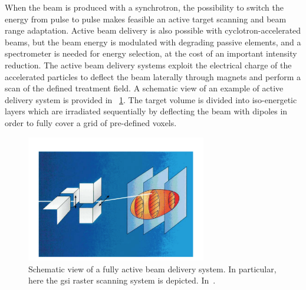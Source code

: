 When the beam is produced with a synchrotron,  the possibility to switch the energy from pulse to pulse makes feasible an active target scanning and beam range adaptation. Active beam delivery is also possible with cyclotron-accelerated beams, but the beam energy is modulated with degrading passive elements, and a spectrometer is needed for energy selection, at the cost of an important intensity reduction. The active beam delivery systems exploit the electrical charge of the accelerated particles to deflect the beam laterally through magnets and perform a scan of the defined treatment field. A schematic view of an example of active delivery system is provided in \figurename~\ref{chap1::fig::activeDelivery}. The target volume is divided into iso-energetic layers which are irradiated sequentially by deflecting the beam with dipoles in order to fully cover a grid of pre-defined voxels.              

\begin{figure}[!htbp]
\centering
\includegraphics[width=0.7\textwidth]{03_GraphicFiles/chapter1_Introduction/activeDelivery.pdf}
\caption{Schematic view of a fully active beam delivery system. In particular, here the \gls{gsi} raster scanning system is depicted. In~\cite{Schulz-Ertner2006}.}
\label{chap1::fig::activeDelivery}
\end{figure} 

